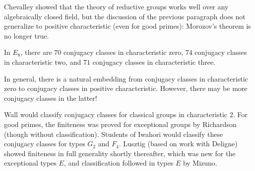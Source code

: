 \documentclass[../notes.tex]{subfiles}
\begin{document}
Chevalley showed that the theory of reductive groups works well over any algebraically closed field, but the discussion of the previous paragraph does not generalize to positive characteristic (even for good primes): Morozov's theorem is no longer true.
\begin{example}
	In $E_8$, there are $70$ conjugacy classes in characteristic zero, $74$ conjugacy classes in characteristic two, and $71$ conjugacy classes in characteristic three.
\end{example}
\begin{remark}
	In general, there is a natural embedding from conjugacy classes in characteristic zero to conjugacy classes in positive characteristic. However, there may be more conjugacy classes in the latter!
\end{remark}
Wall would classify conjugacy classes for classical groups in characteristic $2$. For good primes, the finiteness was proved for exceptional groups by Richardson (though without classification). Students of Iwahori would classify these conjugacy classes for types $G_2$ and $F_4$. Lusztig (based on work with Deligne) showed finiteness in full generality shortly thereafter, which was new for the exceptional types $E$, and classification followed in types $E$ by Mizuno.
\end{document}
